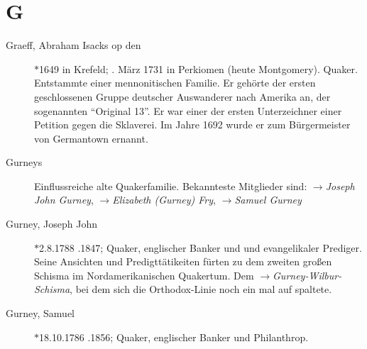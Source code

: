 \section*{G}

\articlesize

\begin{description}

 \item[Graeff, Abraham Isacks op den]  $\ast$1649 in Krefeld; . März 1731
 in Perkiomen (heute Montgomery). Quaker. Entstammte einer mennonitischen Familie.
Er gehörte der ersten geschlossenen Gruppe deutscher Auswanderer nach Amerika
an, der sogenannten "`Original 13"'. Er war einer der ersten Unterzeichner einer
Petition gegen die Sklaverei. Im Jahre 1692 wurde er zum Bürgermeister von
Germantown ernannt.

\item[Gurneys] Einflussreiche alte Quakerfamilie. Bekannteste Mitglieder sind:
$\to$\textit{Joseph John Gurney}, $\to$\textit{Elizabeth (Gurney) Fry},
$\to$\textit{Samuel Gurney}

\item[Gurney, Joseph John] $\ast$2.8.1788 .1847; Quaker, englischer Banker und
und evangelikaler Prediger. Seine Ansichten und Predigttätikeiten fürten zu
dem zweiten großen Schisma im Nordamerikanischen Quakertum. Dem
$\to$\textit{Gurney-Wilbur-Schisma}, bei dem sich die Orthodox-Linie noch ein
mal auf spaltete.

\item[Gurney, Samuel] $\ast$18.10.1786 .1856; Quaker, englischer Banker und
Philanthrop.


 \end{description}

\normalsize
